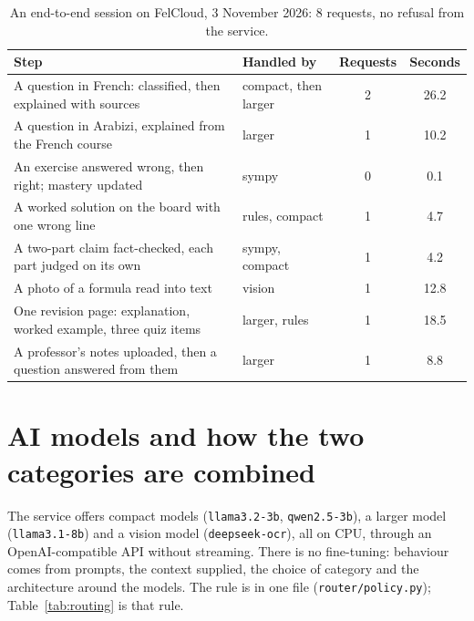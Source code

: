 \documentclass[11pt,a4paper]{article}
\newcommand{\code}[1]{\texttt{\small #1}}
\begin{document}
\begin{table}[H]
\centering\small
\begin{tabularx}{\textwidth}{@{}Yp{3.4cm}cc@{}}
\toprule
\textbf{Step} & \textbf{Handled by} & \textbf{Requests} & \textbf{Seconds} \\
\midrule
A question in French: classified, then explained with sources & compact, then larger & 2 & 26.2 \\
A question in Arabizi, explained from the French course & larger & 1 & 10.2 \\
An exercise answered wrong, then right; mastery updated & sympy & 0 & 0.1 \\
A worked solution on the board with one wrong line & rules, compact & 1 & 4.7 \\
A two-part claim fact-checked, each part judged on its own & sympy, compact & 1 & 4.2 \\
A photo of a formula read into text & vision & 1 & 12.8 \\
One revision page: explanation, worked example, three quiz items & larger, rules & 1 & 18.5 \\
A professor's notes uploaded, then a question answered from them & larger & 1 & 8.8 \\
\bottomrule
\end{tabularx}
\caption{An end-to-end session on FelCloud, 3 November 2026: 8 requests, no refusal from the service.}\label{tab:session}
\end{table}
\vspace{-6pt}

\section{AI models and how the two categories are combined}

The service offers compact models (\code{llama3.2-3b}, \code{qwen2.5-3b}), a larger model (\code{llama3.1-8b}) and a
vision model (\code{deepseek-ocr}), all on CPU, through an OpenAI-compatible API without streaming. There is no
fine-tuning: behaviour comes from prompts, the context supplied, the choice of category and the architecture around
the models. The rule is in one file (\code{router/policy.py}); Table~\ref{tab:routing} is that rule.
\end{document}
